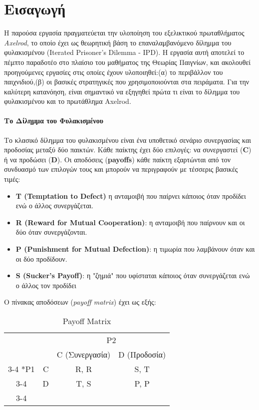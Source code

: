 \chapter{Εισαγωγή}
Η παρούσα εργασία πραγματεύεται την υλοποίηση του εξελικτικού πρωταθλήματος \textit{Axelrod}, το οποίο έχει ως θεωρητική βάση το επαναλαμβανόμενο δίλημμα του φυλακισμένου (Iterated Prisoner's Dilemma - IPD). Η εργασία αυτή αποτελεί το πέμπτο παραδοτέο στο πλαίσιο του μαθήματος της Θεωρίας Παιγνίων, και ακολουθεί προηγούμενες εργασίες στις οποίες έχουν υλοποιηθεί:(α) το περιβάλλον του παιχνιδιού,(β) οι βασικές στρατηγικές που χρησιμοποιούνται στα πειράματα.
Για την καλύτερη κατανόηση, είναι σημαντικό να εξηγηθεί πρώτα τι είναι το δίλημμα του φυλακισμένου και το πρωτάθλημα Axelrod.

\subsubsection*{Το Δίλημμα του Φυλακισμένου}
Το κλασικό δίλημμα του φυλακισμένου είναι ένα υποθετικό σενάριο συνεργασίας και προδοσίας μεταξύ δύο παικτών. Κάθε παίκτης έχει δύο επιλογές: να συνεργαστεί (\textbf{C}) ή να προδώσει (\textbf{D}). Οι αποδόσεις (\textbf{payoffs}) κάθε παίκτη εξαρτώνται από τον συνδυασμό των επιλογών τους και μπορούν να περιγραφούν με τέσσερις βασικές τιμές:
\begin{itemize}
	\item \textbf{T (Temptation to Defect)} η ανταμοιβή που παίρνει κάποιος όταν προδίδει ενώ ο άλλος συνεργάζεται.
	\\
	\item \textbf{R (Reward for Mutual Cooperation)}: η ανταμοιβή που παίρνουν και οι δύο όταν συνεργάζονται.
	\\
	\item \textbf{P (Punishment for Mutual Defection)}: η τιμωρία που λαμβάνουν όταν και οι δύο προδίδουν.
	\\
	\item 
	\textbf{S (Sucker's Payoff)}: η "ζημιά" που υφίσταται κάποιος όταν συνεργάζεται ενώ ο άλλος τον προδίδει
	
\end{itemize}
Ο πίνακας αποδόσεων (\textit{payoff matrix}) έχει ως εξής:
\begin{table}[h]
	\centering
	
	\vspace*{2em}
	\begin{tabular}{cc|c|c|}
		& \multicolumn{1}{c}{} & \multicolumn{2}{c}{P2} \\
		& \multicolumn{1}{c}{} & \multicolumn{1}{c}{C (Συνεργασία)} & \multicolumn{1}{c}{D (Προδοσία)} \\\cline{3-4}
		\multirow{2}*{P1} & C & R, R & S, T \\\cline{3-4}
		& D & T, S & P, P \\\cline{3-4}
	\end{tabular}
	\caption{Payoff Matrix}
\end{table}\\
